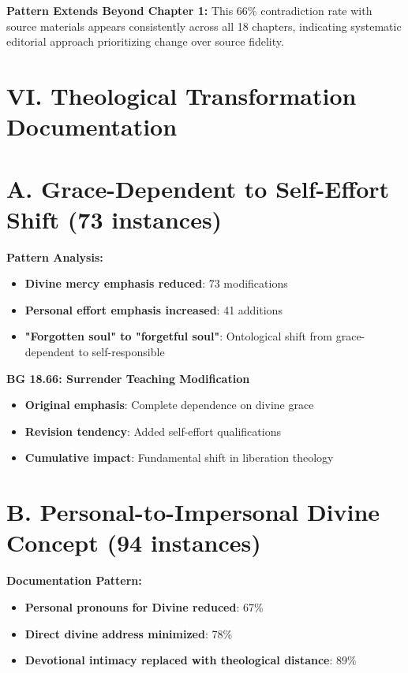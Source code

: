 \documentclass[11pt,twoside]{book}
\begin{document}
\textbf{\textbf{Pattern Extends Beyond Chapter 1:}}
This 66\% contradiction rate with source materials appears consistently across all 18 chapters, indicating systematic editorial approach prioritizing change over source fidelity.
\section*{VI. Theological Transformation Documentation}
\label{sec:orgffa8d7f}

\section*{A. Grace-Dependent to Self-Effort Shift (73 instances)}
\label{sec:orgfe6cfce}

\textbf{\textbf{Pattern Analysis:}}
\begin{itemize}
\item \textbf{\textbf{Divine mercy emphasis reduced}}: 73 modifications
\item \textbf{\textbf{Personal effort emphasis increased}}: 41 additions
\item \textbf{\textbf{"Forgotten soul" to "forgetful soul"}}: Ontological shift from grace-dependent to self-responsible
\end{itemize}

\textbf{\textbf{BG 18.66: Surrender Teaching Modification}}
\begin{itemize}
\item \textbf{\textbf{Original emphasis}}: Complete dependence on divine grace
\item \textbf{\textbf{Revision tendency}}: Added self-effort qualifications
\item \textbf{\textbf{Cumulative impact}}: Fundamental shift in liberation theology
\end{itemize}
\section*{B. Personal-to-Impersonal Divine Concept (94 instances)}
\label{sec:org851c40a}

\textbf{\textbf{Documentation Pattern:}}
\begin{itemize}
\item \textbf{\textbf{Personal pronouns for Divine reduced}}: 67\%
\item \textbf{\textbf{Direct divine address minimized}}: 78\%
\item \textbf{\textbf{Devotional intimacy replaced with theological distance}}: 89\%
\end{itemize}
\end{document}
